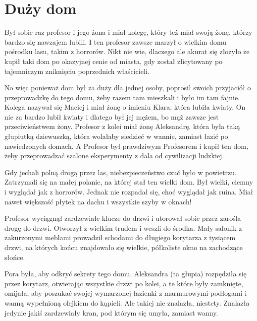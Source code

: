 \chapter{Duży dom}


Był sobie raz profesor i jego żona i miał kolegę, który też miał swoją żonę, którzy bardzo się nawzajem lubili.
I ten profesor zawsze marzył o wielkim domu pośrodku lasu, takim z horrorów.
Nikt nie wie, dlaczego ale akurat się złożyło że kupił taki dom po okazyjnej cenie od miasta, gdy został zlicytowany po tajemniczym zniknięciu poprzednich właścicieli.

No więc ponieważ dom był za duży dla jednej osoby, poprosił swoich przyjaciół o przeprowadzkę do tego domu, żeby razem tam mieszkali i było im tam fajnie.
Kolega nazywał się Maciej i miał żonę o imieniu Klara, która lubiła kwiaty.
On nie za bardzo lubił kwiaty i dlatego był jej mężem, bo mąż zawsze jest przeciwieństwem żony.
Profesor z kolei miał żonę Aleksandrę, która była taką głupiutką dziewuszką, która wolałaby siedzieć w wannie, zamiast łazić po nawiedzonych domach. A Profesor był prawdziwym Profesorem i kupił ten dom, żeby przeprowadzać szalone eksperymenty z dala od cywilizacji ludzkiej.

Gdy jechali polną drogą przez las, niebezpieczeństwo czuć było w powietrzu.
Zatrzymali się na małej polanie, na której stał ten wielki dom.
Był wielki, ciemny i wyglądał jak z horrorów. 
Jednak nie rozpadał się, choć wyglądał jak ruina.
Miał nawet większość płytek na dachu i wszystkie szyby w oknach!

Profesor wyciągnął zardzewiałe klucze do drzwi i utorował sobie przez zarośla drogę do drzwi.
Otworzył z wielkim trudem i weszli do środka.
Mały salonik z zakurzonymi meblami prowadził schodami do długiego korytarza z tysiącem drzwi, na których końcu znajdowało się wielkie, półkoliste okno na zachodzące słońce.

Pora była, aby odkryć sekrety tego domu.
Aleksandra (ta głupia) rozpędziła się przez korytarz, otwierając wszystkie drzwi po kolei, a te które były zamknięte, omijała, aby poszukać swojej wymarzonej łazienki z marmurowymi podłogami i wanną wypełnioną olejkiem do kąpieli. Ale takiej nie znalazła, niestety. Znalazła jedynie jakiś zardzewiały kran, pod którym się umyła, zamiast wanny. 

